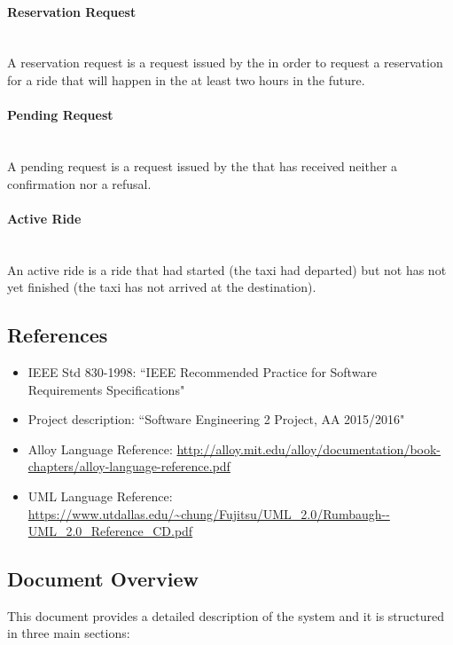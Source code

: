 \paragraph{Reservation Request} \hfill \\
\label{def:reservation-request} A reservation request is a request issued by the  in order to request a reservation for a ride that will happen in the at least two hours in the future.

\paragraph{Pending Request} \hfill \\
\label{def:pending-request} A pending request is a request issued by the  that has received neither a confirmation nor a refusal.

\paragraph{Active Ride} \hfill \\
\label{def:active-ride} An active ride is a ride that had started (the taxi had departed) but not has not yet finished (the taxi has not arrived at the destination).


\subsection{References}
\begin{itemize}
\item IEEE Std 830-1998: ``IEEE Recommended Practice for Software Requirements Specifications"
\item Project description: ``Software Engineering 2 Project, AA 2015/2016"
\item Alloy Language Reference: \url{http://alloy.mit.edu/alloy/documentation/book-chapters/alloy-language-reference.pdf}
\item UML Language Reference: \url{https://www.utdallas.edu/~chung/Fujitsu/UML_2.0/Rumbaugh--UML_2.0_Reference_CD.pdf}
\end{itemize}


\subsection{Document Overview}
This document provides a detailed description of the system and it is structured in three main sections:

